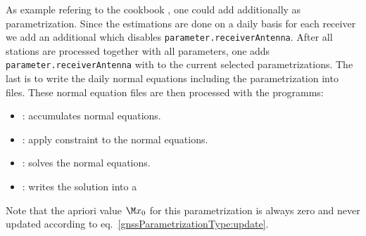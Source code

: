 As example refering to the cookbook ,
one could add additionally  as parametrization.
Since the estimations are done on a daily basis for each receiver we add an additional
 which
disables \verb|parameter.receiverAntenna|. After all stations are processed together with all parameters, one
adds \verb|parameter.receiverAntenna| with 
 to the current selected parametrizations.
The last  is 
to write the daily normal equations including the parametrization  into files.
These normal equation files are then processed with the programms:

\begin{itemize}
  \item {}: accumulates normal equations.
  \item {}: apply constraint to the normal equations.
  \item {}: solves the normal equations.
  \item {}: writes the solution into a 
\end{itemize}

Note that the apriori value $\M x_0$ for this parametrization is always zero and never updated
according to eq.~\eqref{gnssParametrizationType:update}.


